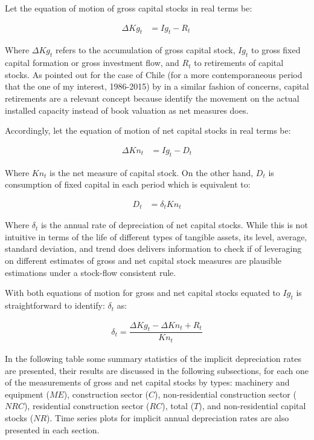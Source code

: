 Let the equation of motion of gross capital stocks in real terms be: 

\begin{align}
\Delta Kg_{t} &= Ig_{t} -R_{t}\  
\end{align}

Where $\Delta Kg_{t}$ refers to the accumulation of gross capital stock, $Ig_{t}$ to gross fixed capital formation or gross investment flow, and $R_{t}$ to retirements of capital stocks. As pointed out for the case of Chile (for a more contemporaneous period that the one of my interest, 1986-2015) by \citet{Ffrench2016} in a similar fashion of \citet{Shaikh2016} concerns, capital retirements are a  relevant concept because identify the movement on the actual installed capacity instead of book valuation as net measures does. 

Accordingly, let the equation of motion of net capital stocks in real terms be:  

\begin{align}
\Delta Kn_{t} &= Ig_{t} -D_{t}    
\end{align}

Where $Kn_{t}$ is the net measure of capital stock. On the other hand, $D_{t}$ is consumption of fixed capital in each period which is equivalent to: 

\begin{align}
D_{t} &= \delta_{t} Kn_{t}
\end{align}


Where $\delta_{t}$ is the annual rate of depreciation of net capital stocks. While this is not intuitive in terms of the life of different types of tangible assets, its level, average, standard deviation, and trend does delivers information to check if of leveraging on different estimates of gross and net capital stock measures are plausible estimations under a stock-flow consistent rule. 

With both equations of motion for gross and net capital stocks equated to $Ig_{t}$ is straightforward to identify: $\delta_{t}$ as: 

\begin{align}
\delta_{t} = \dfrac{\Delta Kg_{t} - \Delta Kn_{t} + R_{t}}{Kn_{t}}    
\end{align}

In the following table some summary statistics of the implicit depreciation rates are presented, their results are discussed in the following subsections, for each one of the measurements of gross and net capital stocks by types: machinery and equipment ($ME$), construction sector ($C$), non-residential construction sector ($NRC$), residential construction sector ($RC$), total ($T$), and non-residential capital stocks ($NR$). Time series plots for implicit annual depreciation rates are also presented in each section. 

